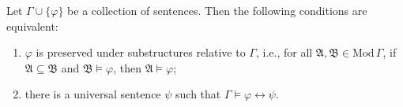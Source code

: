 Let $\Gamma \cup \{\varphi\}$ be a collection of sentences. Then the following conditions are equivalent:

\begin{enumerate}
\item[(i)] $\varphi$ is preserved under substructures relative to $\Gamma$, i.e., for all $\mathfrak{A}, \mathfrak{B} \in \mathrm{Mod}\,\Gamma$, if $\mathfrak{A} \subseteq \mathfrak{B}$ and $\mathfrak{B} \models \varphi$, then $\mathfrak{A} \models \varphi$;

\item[(ii)] there is a universal sentence $\psi$ such that $\Gamma \models \varphi \leftrightarrow \psi$.
\end{enumerate}

